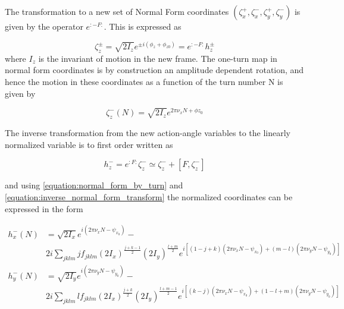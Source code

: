 The transformation to a new set of Normal Form coordinates \(\left(\zeta_{x}^{+}, \zeta_{x}^{-}, \zeta_{y}^{+}, \zeta_{y}^{-}\right)\) is given by the operator \(e^{: -F :}\).
This is expressed as

\begin{equation}
    \zeta_{z}^{\pm} = \sqrt{2 I_{z}} e^{\pm i \left(\phi_{z}+\phi_{z 0} \right)} = e^{:-F:} h_{z}^{\pm}
    \label{equation:action_angle_to_normal_form}
\end{equation}
where \(I_{z}\) is the invariant of motion in the new frame.
The one-turn map in normal form coordinates is by construction an amplitude dependent rotation, and hence the motion in these coordinates as a function of the turn number N is given by

\begin{equation}
    \zeta_{z}^{-}(N) = \sqrt{2 I_{z}} e^{2 \pi \nu_{x} N + \phi z_{0}}
    \label{equation:normal_form_by_turn}
\end{equation}

The inverse transformation from the new action-angle variables to the linearly normalized variable is to first order written as

\begin{equation}
    h_{z}^{-} = e^{: F:} \zeta_{z}^{-} \simeq \zeta_{z}^{-} + \left[F, \zeta_{z}^{-}\right]
    \label{equation:inverse_normal_form_transform}
\end{equation}

and using \cref{equation:normal_form_by_turn} and \cref{equation:inverse_normal_form_transform} the normalized coordinates can be expressed in the form

\begin{equation}
    \begin{aligned}
    h_{x}^{-}(N) &= \sqrt{2 I_{x}} e^{i\left(2 \pi \nu_{x} N - \psi_{x_{0}}\right)} - \\
    & 2 i \sum_{jklm} j f_{jklm} \left(2 I_{x}\right)^{\frac{j+k-1}{2}} \left(2 I_{y}\right)^{\frac{l+m}{2}} e^{i \left[(1-j+k) \left(2 \pi \nu_{x} N-\psi_{x_{0}}\right) + (m-l) \left(2 \pi \nu_{y} N-\psi_{y_{0}}\right) \right]} \\
    h_{y}^{-}(N) &= \sqrt{2 I_{y}} e^{i\left(2 \pi \nu_{y} N - \psi_{y_{0}}\right)} - \\
    & 2 i \sum_{jklm} l f_{jklm} \left(2 I_{x}\right)^{\frac{j+k}{2}} \left(2 I_{y}\right)^{\frac{l+m-1}{2}} e^{i \left[(k-j) \left(2 \pi \nu_{x} N-\psi_{x_{0}}\right) + (1-l+m) \left(2 \pi \nu_{y} N-\psi_{y_{0}}\right) \right]}
    \end{aligned}
    \label{equation:normal_form_coordinates}
\end{equation}

